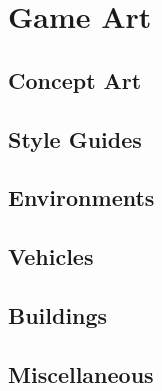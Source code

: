 \chapter{Game Art}
\section{Concept Art} %
\section{Style Guides} %
\section{Environments} %
\section{Vehicles} %
\section{Buildings} %
\section{Miscellaneous} %
